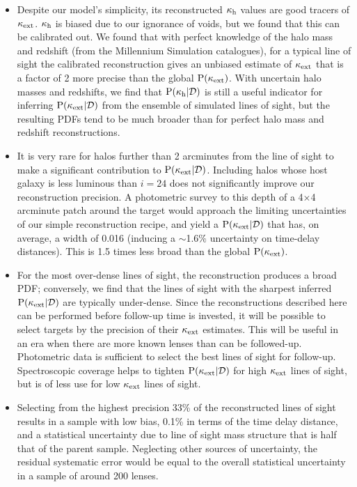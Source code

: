 \documentclass[useAMS,usenatbib,a4paper]{mn2e}
\begin{document}
\begin{itemize} 

\item Despite our model's simplicity, its reconstructed $\kappa_{\rm h}$ values are
good tracers of $\kappa_{\rm ext}$. $\kappa_{\rm h}$ is biased due to our ignorance of voids, but we found that this can be calibrated out. We found that with perfect knowledge of
the halo mass and redshift (from the Millennium Simulation catalogues), for a
typical line of sight the calibrated reconstruction gives an unbiased estimate
of $\kappa_{\rm ext}$ that is a factor of 2 more precise than the global ${\rm P}(\kappa_{\rm ext})$.
With uncertain halo masses and redshifts, we find that
${\rm P}(\kappa_{\rm h}|{\mathcal{D}})$ is still a useful indicator for inferring
${\rm P}(\kappa_{\rm ext}|{\mathcal{D}})$ from the ensemble of simulated lines of sight, but the
resulting PDFs tend to be much broader than for perfect halo mass and redshift
reconstructions.

\item It is very rare for halos further than 2 arcminutes from the line of
sight to make a significant contribution to ${\rm P}(\kappa_{\rm ext}|{\mathcal{D}})$. Including
halos whose host galaxy is less luminous than $i=24$ does not significantly
improve our reconstruction precision.  A photometric survey to this depth of a
4$\times$4 arcminute patch around the target would approach the limiting
uncertainties of our simple reconstruction recipe, and yield a 
${\rm P}(\kappa_{\rm ext}|{\mathcal{D}})$ that has, on average, a width of 0.016 (inducing a $\sim$1.6\%
uncertainty on time-delay distances). This is 1.5 times
less broad than the global ${\rm P}(\kappa_{\rm ext})$. 

\item  For the most over-dense lines of sight, the reconstruction produces a
broad PDF; conversely, we find that the lines of sight with the sharpest
inferred ${\rm P}(\kappa_{\rm ext}|{\mathcal{D}})$ are typically under-dense. Since the
reconstructions described here can be performed before follow-up time is
invested, it will be possible to select targets by the precision of their
$\kappa_{\rm ext}$ estimates. This will be useful
in an era when there are more known lenses than can be followed-up.
Photometric data is sufficient to select the best lines of sight for
follow-up. Spectroscopic coverage helps to tighten  ${\rm P}(\kappa_{\rm ext}|{\mathcal{D}})$ for
high $\kappa_{\rm ext}$ lines of sight, but is of less use for low $\kappa_{\rm ext}$ lines of
sight.

\item Selecting from the highest precision 33\% of the reconstructed lines of sight
results in a sample with low bias, 0.1\% in terms of the time delay distance,
and a statistical uncertainty due to line of sight mass structure that is half
that of the parent sample. Neglecting other sources of uncertainty, the residual systematic error would be equal to the
overall statistical uncertainty in a sample of around 200 lenses.


\end{itemize}
\end{document}
